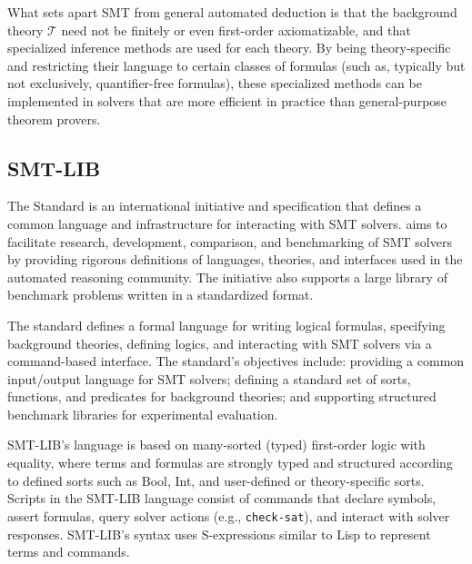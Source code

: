 What sets apart SMT from general automated deduction is that the background theory $\mathcal{T}$ need not be finitely or even first-order axiomatizable, and that specialized inference methods are used for each theory.
By being theory-specific and restricting their language to certain classes of formulas (such as, typically but not exclusively, quantifier-free formulas), these specialized methods can be implemented in solvers that are more efficient in practice than general-purpose theorem provers.

\subsection{SMT-LIB}

The \smtlib Standard is an international initiative and specification that defines a common language and infrastructure for interacting with SMT solvers.
\smtlib aims to facilitate research, development, comparison, and benchmarking of SMT solvers by providing rigorous definitions of languages, theories, and interfaces used in the automated reasoning community.
The initiative also supports a large library of benchmark problems written in a standardized format.

The \smtlib standard defines a formal language for writing logical formulas, specifying background theories, defining logics, and interacting with SMT solvers via a command-based interface. The standard’s objectives include: providing a common input/output language for SMT solvers; defining a standard set of sorts, functions, and predicates for background theories; and supporting structured benchmark libraries for experimental evaluation.

SMT-LIB’s language is based on many-sorted (typed) first-order logic with equality, where terms and formulas are strongly typed and structured according to defined sorts such as Bool, Int, and user-defined or theory-specific sorts.
Scripts in the SMT-LIB language consist of commands that declare symbols, assert formulas, query solver actions (e.g., \texttt{check-sat}), and interact with solver responses.
SMT-LIB’s syntax uses S-expressions similar to Lisp to represent terms and commands.

